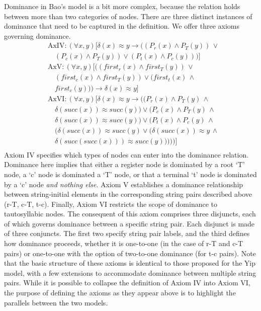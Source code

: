 \documentclass{article}
\newcommand{\ap}{\approx}
\newcommand{\all}{\forall}
\begin{document}
Dominance in Bao's model is a bit more complex, because the relation holds between more than two categories of nodes. There are three distinct instances of dominance that need to be captured in the definition. We offer three axioms governing dominance.
\begin{equation}
\begin{aligned}
&\text{AxIV:}\,(\all x,y)[\delta(x)\ap y \rightarrow \big((P_{r}(x)\land P_{T}(y))\,\lor \\
&\quad (P_{c}(x)\land P_{T}(y)) \lor (P_{t}(x)\land P_{c}(y))\big)] \\
&\text{AxV:}\,(\all x,y)[\big((first_{r}(x)\land first_{T}(y)) \,\lor \\
&\quad (first_{c}(x)\land first_{T}(y))\lor (first_{t}(x)\,\land \\
&\quad first_{c}(y))\big) \rightarrow \delta(x) \ap y] \\
&\text{AxVI:}\,(\all x,y)[\delta(x)\ap y \rightarrow \Big(\big(P_{r}(x)\land P_{T}(y)\,\land \\
&\quad \delta(succ(x)) \ap succ(y)\big) \lor \big(P_{c}(x)\land P_{T}(y)\,\land \\
&\quad \delta(succ(x)) \ap succ(y)\big)\lor \big(P_{t}(x)\land P_{c}(y) \,\land \\
&\quad (\delta(succ(x))\ap succ(y)\lor (\delta(succ(x))\ap y \,\land \\
&\quad \delta(succ(succ(x)))\ap succ(y)))\big)\Big)] \\
\end{aligned}
\end{equation}
Axiom IV specifies which types of nodes can enter into the dominance relation. Dominance here implies that either a register node is dominated by a root `T' node, a `c' node is dominated a `T' node, or that a terminal `t' node is dominated by a `c' node \emph{and nothing else}. Axiom V establishes a dominance relationship between string-initial elements in the corresponding string pairs described above (r-T, c-T, t-c). Finally, Axiom VI restricts the scope of dominance to tautosyllabic nodes. The consequent of this axiom comprises three disjuncts, each of which governs dominance between a specific string pair. Each disjunct is made of three conjuncts. The first two specify string pair labels, and the third defines how dominance proceeds, whether it is one-to-one (in the case of r-T and c-T pairs) or one-to-one with the option of two-to-one dominance (for t-c pairs). Note that the basic structure of these axioms is identical to those proposed for the Yip model, with a few extensions to accommodate dominance between multiple string pairs. While it is possible to collapse the definition of Axiom IV into Axiom VI, the purpose of defining the axioms as they appear above is to highlight the parallels between the two models. \par
\end{document}
